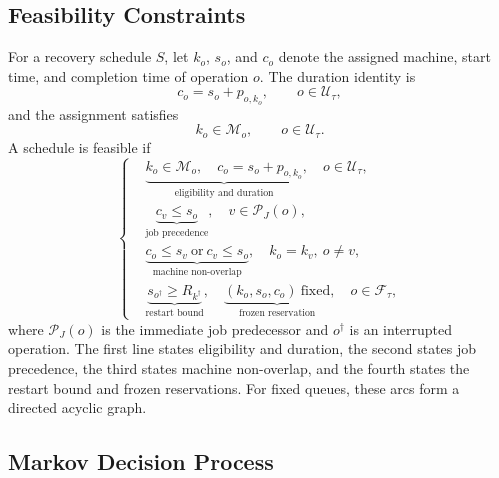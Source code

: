 \documentclass[conference]{IEEEtran}
\theoremstyle{remark}
\newcommand{\cP}{\mathcal{P}}
\newcommand{\cU}{\mathcal{U}}
\newcommand{\cF}{\mathcal{F}}
\newcommand{\cM}{\mathcal{M}}
\begin{document}
\subsection{Feasibility Constraints}
\label{sec:S-feasibility}

For a recovery schedule $S$, let $k_o$, $s_o$, and $c_o$ denote the assigned machine, start time, and completion time of operation $o$. The duration identity is
\begin{equation}
c_o=s_o+p_{o,k_o},\qquad o\in\cU_\tau,
\label{eq:S-duration}
\end{equation}
and the assignment satisfies
\begin{equation}
k_o\in\cM_o,\qquad o\in\cU_\tau.
\label{eq:S-elig}
\end{equation}
A schedule is feasible if
\begin{equation}
\left\{
\begin{aligned}
&\underbrace{k_o\in\cM_o,\quad c_o=s_o+p_{o,k_o}}_{\text{eligibility and duration}},\quad o\in\cU_\tau,\\
&\underbrace{c_v\le s_o}_{\text{job precedence}},\quad v\in\cP_J(o),\\
&\underbrace{c_o\le s_v\ \text{or}\ c_v\le s_o}_{\text{machine non-overlap}},\quad k_o=k_v,\ o\ne v,\\
&\underbrace{s_{o^{\dagger}}\ge R_{k^{\dagger}}}_{\text{restart bound}},\quad
\underbrace{(k_o,s_o,c_o)\ \text{fixed}}_{\text{frozen reservation}},\quad o\in\cF_\tau,
\end{aligned}
\right.
\label{eq:S-feas}
\end{equation}
where $\cP_J(o)$ is the immediate job predecessor and $o^{\dagger}$ is an interrupted operation. The first line states eligibility and duration, the second states job precedence, the third states machine non-overlap, and the fourth states the restart bound and frozen reservations. For fixed queues, these arcs form a directed acyclic graph.

\subsection{Markov Decision Process}
\label{sec:S-mdp}
\end{document}
